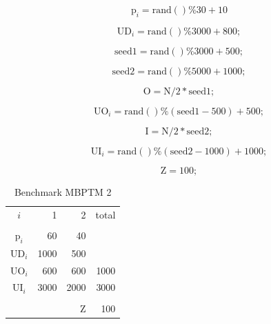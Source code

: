 \documentclass[authoryear,manuscript,12pt]{elsarticle}
\begin{document}
\begin{equation}
\textrm{p}_i = \textrm{rand}()\%30 + 10
\end{equation}

\begin{equation}
\textrm{UD}_i = \textrm{rand}()\%3000 + 800;
\end{equation}

\begin{equation}
 \textrm{seed1} = \textrm{rand}()\%3000 + 500;
\end{equation}

\begin{equation}
\textrm{seed2} = \textrm{rand}()\%5000 + 1000;
\end{equation}

\begin{equation}
\textrm{O} = \textrm{N}/2*\textrm{seed1};
\end{equation}

\begin{equation}
\textrm{UO}_i = \textrm{rand}()\%(\textrm{seed1}-500) + 500;
\end{equation}

\begin{equation}
\textrm{I} = \textrm{N}/2*\textrm{seed2};
\end{equation}

\begin{equation}
\textrm{UI}_i = \textrm{rand}()\%(\textrm{seed2}-1000) + 1000;
\end{equation}

\begin{equation}
\textrm{Z} = 100;
\end{equation}


\begin{table}[h]
\begin{center}
\begin{tabular}[c]{c r r r}
$i$ & 1 & 2 & total \\
\cline {1-4} \\
$\textrm{p}_i$ & 60 & 40 & \\
$\textrm{UD}_i$ & 1000 & 500 & \\
$\textrm{UO}_i$ & 600 & 600 & 1000 \\
$\textrm{UI}_i$ & 3000 & 2000 & 3000 \\
\cline {1-4} \\
& & $\textrm{Z}$ & 100 \\
\end{tabular}
\caption{Benchmark MBPTM 2}
\label{tab:MBPTMP001}
\end{center}
\end{table}
\end{document}
